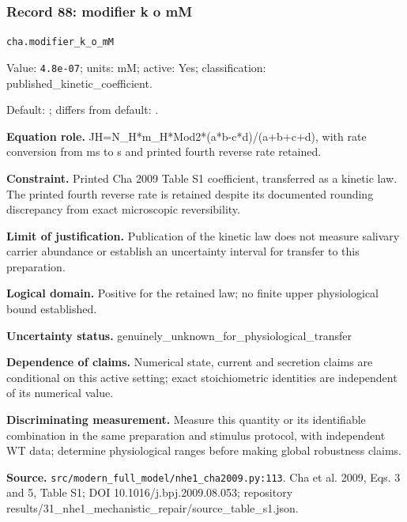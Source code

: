 \subsubsection*{Record 88: modifier k o mM}
{\small \nolinkurl{cha.modifier_k_o_mM}\par

Value: \texttt{4.8e-07}; units: mM; active: Yes; classification: published\_kinetic\_coefficient.\par

Default: ; differs from default: .\par

\textbf{Equation role.} JH=N\_H*m\_H*Mod2*(a*b-c*d)/(a+b+c+d), with rate conversion from ms to s and printed fourth reverse rate retained.\par

\textbf{Constraint.} Printed Cha 2009 Table S1 coefficient, transferred as a kinetic law. The printed fourth reverse rate is retained despite its documented rounding discrepancy from exact microscopic reversibility.\par

\textbf{Limit of justification.} Publication of the kinetic law does not measure salivary carrier abundance or establish an uncertainty interval for transfer to this preparation.\par

\textbf{Logical domain.} Positive for the retained law; no finite upper physiological bound established.\par

\textbf{Uncertainty status.} genuinely\_unknown\_for\_physiological\_transfer\par

\textbf{Dependence of claims.} Numerical state, current and secretion claims are conditional on this active setting; exact stoichiometric identities are independent of its numerical value.\par

\textbf{Discriminating measurement.} Measure this quantity or its identifiable combination in the same preparation and stimulus protocol, with independent WT data; determine physiological ranges before making global robustness claims.\par

\textbf{Source.} \nolinkurl{src/modern_full_model/nhe1_cha2009.py:113}. Cha et al. 2009, Eqs. 3 and 5, Table S1; DOI 10.1016/j.bpj.2009.08.053; repository results/31\_nhe1\_mechanistic\_repair/source\_table\_s1.json.\par}

